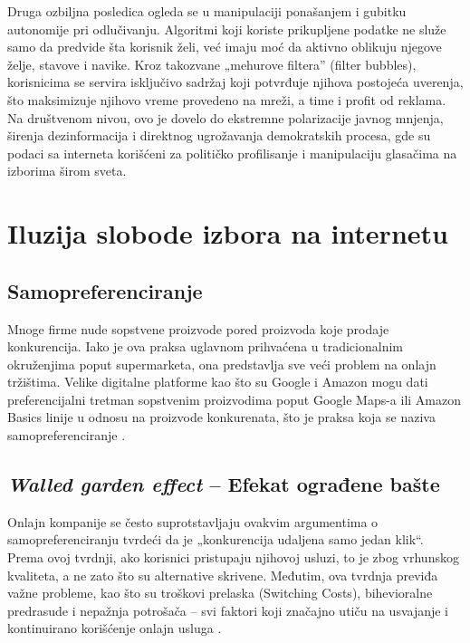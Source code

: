 \documentclass[12pt,a4paper]{article}
\begin{document}
Druga ozbiljna posledica ogleda se u manipulaciji ponašanjem i gubitku autonomije pri odlučivanju. Algoritmi koji koriste prikupljene podatke ne služe samo da predvide šta korisnik želi, već imaju moć da aktivno oblikuju njegove želje, stavove i navike. Kroz takozvane „mehurove filtera” (filter bubbles), korisnicima se servira isključivo sadržaj koji potvrđuje njihova postojeća uverenja, što maksimizuje njihovo vreme provedeno na mreži, a time i profit od reklama. Na društvenom nivou, ovo je dovelo do ekstremne polarizacije javnog mnjenja, širenja dezinformacija i direktnog ugrožavanja demokratskih procesa, gde su podaci sa interneta korišćeni za političko profilisanje i manipulaciju glasačima na izborima širom sveta.

\section{Iluzija slobode izbora na internetu}
\subsection{\textbf{Samopreferenciranje}}

Mnoge firme nude sopstvene proizvode pored proizvoda koje prodaje konkurencija. Iako je ova praksa uglavnom prihvaćena u tradicionalnim okruženjima poput supermarketa, ona predstavlja sve veći problem na onlajn tržištima. Velike digitalne platforme kao što su Google i Amazon mogu dati preferencijalni tretman sopstvenim proizvodima poput Google Maps-a ili Amazon Basics linije u odnosu na proizvode konkurenata, što je praksa koja se naziva samopreferenciranje \cite{amazon_self_preferencing}.

\subsection{\textbf{\textit{Walled garden effect} – Efekat ograđene bašte}}

Onlajn kompanije se često suprotstavljaju ovakvim argumentima o samopreferenciranju tvrdeći da je „konkurencija udaljena samo jedan klik“. Prema ovoj tvrdnji, ako korisnici pristupaju njihovoj usluzi, to je zbog vrhunskog kvaliteta, a ne zato što su alternative skrivene. Međutim, ova tvrdnja previđa važne probleme, kao što su troškovi prelaska (Switching Costs), bihevioralne predrasude i nepažnja potrošača – svi faktori koji značajno utiču na usvajanje i kontinuirano korišćenje onlajn usluga \cite{amazon_self_preferencing}.
\end{document}
